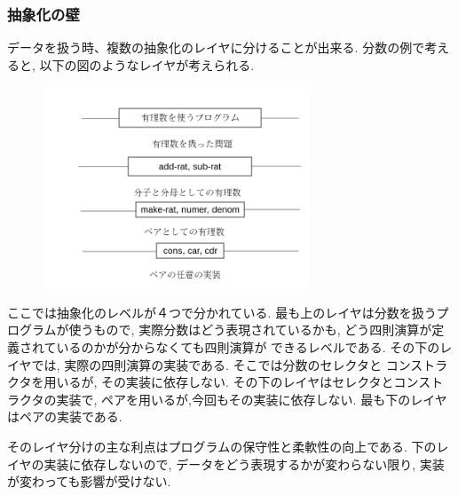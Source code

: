 \subsubsection{抽象化の壁}
データを扱う時、複数の抽象化のレイヤに分けることが出来る.
分数の例で考えると, 以下の図のようなレイヤが考えられる.
\vskip -0.6cm
\begin{figure}[h]
  \centering
  \includegraphics[width=8cm,height=6cm]{imgs/abstraction-barrier.png}
\end{figure}

ここでは抽象化のレベルが４つで分かれている. 最も上のレイヤは分数を扱うプログラムが使うもので,
実際分数はどう表現されているかも, どう四則演算が定義されているのかが分からなくても四則演算が
できるレベルである. その下のレイヤでは, 実際の四則演算の実装である. そこでは分数のセレクタと
コンストラクタを用いるが, その実装に依存しない. その下のレイヤはセレクタとコンストラクタの実装で,
ペアを用いるが,今回もその実装に依存しない. 最も下のレイヤはペアの実装である.

そのレイヤ分けの主な利点はプログラムの保守性と柔軟性の向上である.
下のレイヤの実装に依存しないので, データをどう表現するかが変わらない限り,
実装が変わっても影響が受けない.
